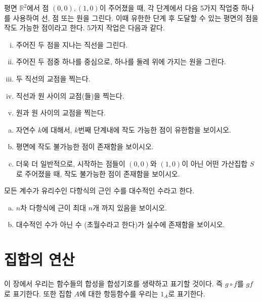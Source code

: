 \begin{exercise}
    평면 $\mathbb{R}^2$에서 점 $(0, 0), (1, 0)$이 주어졌을 때, 각 단계에서 다음 5가지 작업중 하나를 사용하여 선, 점 또는 원을 그린다.
    이때 유한한 단계 후 도달할 수 있는 평면의 점을 작도 가능한 점이라고 한다.
    5가지 작업은 다음과 같다.
    \begin{enumerate}[(i)]
        \item 주어진 두 점을 지나는 직선을 그린다.
        \item 주어진 두 점중 하나를 중심으로, 하나를 둘레 위에 가지는 원을 그린다.
        \item 두 직선의 교점을 찍는다.
        \item 직선과 원 사이의 교점(들)을 찍는다.
        \item 원과 원 사이의 교점을 찍는다.
    \end{enumerate}
    \begin{enumerate}[(a)]
        \item 자연수 $k$에 대해서, $k$번째 단계내에 작도 가능한 점이 유한함을 보이시오.
        \item 평면에 작도 불가능한 점이 존재함을 보이시오.
        \item 더욱 더 일반적으로, 시작하는 점들이 $(0, 0)$와 $(1, 0)$이 아닌 어떤 가산집합 $S$로 주어졌을 때, 작도 불가능한 점이 존재함을 보이시오.
    \end{enumerate}
\end{exercise}
\begin{exercise}
    모든 계수가 유리수인 다항식의 근인 수를 대수적인 수라고 한다.
    \begin{enumerate}[(a)]
        \item $n$차 다항식에 근이 최대 $n$개 까지 있음을 보이시오.
        \item 대수적인 수가 아닌 수 (초월수라고 한다)가 실수에 존재함을 보이시오.
    \end{enumerate}
\end{exercise}


\chapter{집합의 연산}
이 장에서 우리는 함수들의 합성을 합성기호를 생략하고 표기할 것이다.
즉 $g \circ f$를 $gf$로 표기한다.
또한 집합 $A$에 대한 항등함수를 우리는 $1_A$로 표기한다.

